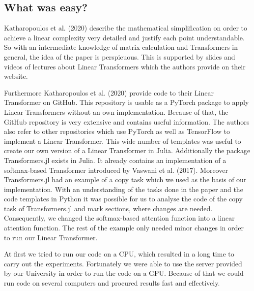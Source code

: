 \documentclass[DIV=13,fontsize=11pt]{scrartcl}
\begin{document}
\subsection{What was easy?}
Katharopoulos et al. (2020) describe the mathematical simplification on order to achieve a linear complexity very detailed and justify each point understandable. So with an intermediate knowledge of matrix calculation and Transformers in general, the idea of the paper is perspicuous. This is supported by slides and videos of lectures about Linear Transformers which the authors provide on their website. 

Furthermore Katharopoulos et al. (2020) provide code to their Linear Transformer on GitHub. This repository is usable as a PyTorch package to apply Linear Transformers without an own implementation. Because of that, the GitHub repository is very extensive and contains useful information. The authors also refer to other repositories which use PyTorch as well as TensorFlow to implement a Linear Transformer. This wide number of templates was useful to create our own version of a Linear Transformer in Julia. Additionally the package Transformers.jl exists in Julia. It already contains an implementation of a softmax-based Transformer introduced by Vaswani et al. (2017). Moreover Transformers.jl had an example of a copy task which we used as the basis of our implementation. With an understanding of the tasks done in the paper and the code templates in Python it was possible for us to analyse the code of the copy task of Transformers.jl and mark sections, where changes are needed. Consequently, we changed the softmax-based attention function into a linear attention function. The rest of the example only needed minor changes in order to run our Linear Transformer.

At first we tried to run our code on a CPU, which resulted in a long time to carry out the experiments. Fortunately we were able to use the server provided by our University in order to run the code on a GPU. Because of that we could run code on several computers and procured results fast and effectively. 


\end{document}
